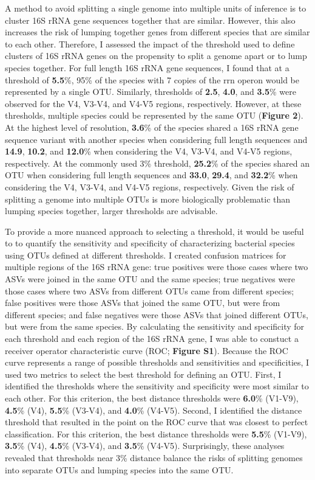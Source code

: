\documentclass[
]{article}
\begin{document}
A method to avoid splitting a single genome into multiple units of
inference is to cluster 16S rRNA gene sequences together that are
similar. However, this also increases the risk of lumping together genes
from different species that are similar to each other. Therefore, I
assessed the impact of the threshold used to define clusters of 16S rRNA
genes on the propensity to split a genome apart or to lump species
together. For full length 16S rRNA gene sequences, I found that at a
threshold of \textbf{5.5}\%, 95\% of the species with 7 copies of the
rrn operon would be represented by a single OTU. Similarly, thresholds
of \textbf{2.5}, \textbf{4.0}, and \textbf{3.5}\% were observed for the
V4, V3-V4, and V4-V5 regions, respectively. However, at these
thresholds, multiple species could be represented by the same OTU
(\textbf{Figure 2}). At the highest level of resolution, \textbf{3.6}\%
of the species shared a 16S rRNA gene sequence variant with another
species when considering full length sequences and \textbf{14.9},
\textbf{10.2}, and \textbf{12.0}\% when considering the V4, V3-V4, and
V4-V5 regions, respectively. At the commonly used 3\% threshold,
\textbf{25.2}\% of the species shared an OTU when considering full
length sequences and \textbf{33.0}, \textbf{29.4}, and \textbf{32.2}\%
when considering the V4, V3-V4, and V4-V5 regions, respectively. Given
the risk of splitting a genome into multiple OTUs is more biologically
problematic than lumping species together, larger thresholds are
advisable.

To provide a more nuanced approach to selecting a threshold, it would be
useful to to quantify the sensitivity and specificity of characterizing
bacterial species using OTUs defined at different thresholds. I created
confusion matrices for multiple regions of the 16S rRNA gene: true
positives were those cases where two ASVs were joined in the same OTU
and the same species; true negatives were those cases where two ASVs
from different OTUs came from different species; false positives were
those ASVs that joined the same OTU, but were from different species;
and false negatives were those ASVs that joined different OTUs, but were
from the same species. By calculating the sensitivity and specificity
for each threshold and each region of the 16S rRNA gene, I was able to
constuct a receiver operator characteristic curve (ROC; \textbf{Figure
S1}). Because the ROC curve represents a range of possible thresholds
and sensitivities and specificities, I used two metrics to select the
best threshold for defining an OTU. First, I identified the thresholds
where the sensitivity and specificity were most similar to each other.
For this criterion, the best distance thresholds were \textbf{6.0}\%
(V1-V9), \textbf{4.5}\% (V4), \textbf{5.5}\% (V3-V4), and \textbf{4.0}\%
(V4-V5). Second, I identified the distance threshold that resulted in
the point on the ROC curve that was closest to perfect classification.
For this criterion, the best distance thresholds were \textbf{5.5}\%
(V1-V9), \textbf{3.5}\% (V4), \textbf{4.5}\% (V3-V4), and \textbf{3.5}\%
(V4-V5). Surprisingly, these analyses revealed that thresholds near 3\%
distance balance the risks of splitting genomes into separate OTUs and
lumping species into the same OTU.
\end{document}
